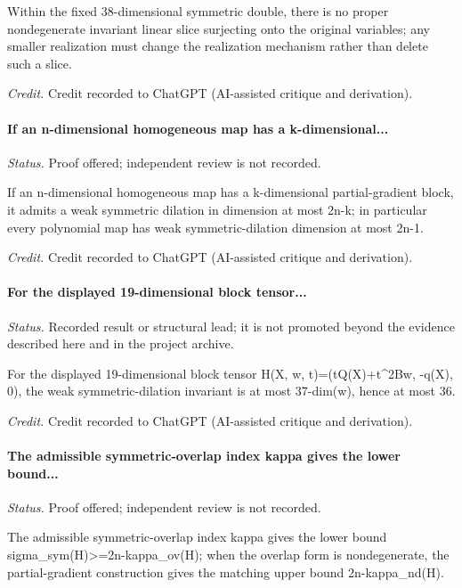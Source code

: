 Within the fixed 38-dimensional symmetric double, there is no proper nondegenerate invariant linear slice surjecting onto the original variables; any smaller realization must change the realization mechanism rather than delete such a slice.

\emph{Credit.} Credit recorded to ChatGPT (AI-assisted critique and derivation).

\label{supp-note-05-026}
\paragraph{If an n-dimensional homogeneous map has a k-dimensional...}
\emph{Status.} Proof offered; independent review is not recorded.

If an n-dimensional homogeneous map has a k-dimensional partial-gradient block, it admits a weak symmetric dilation in dimension at most 2n-k; in particular every polynomial map has weak symmetric-dilation dimension at most 2n-1.

\emph{Credit.} Credit recorded to ChatGPT (AI-assisted critique and derivation).

\label{supp-note-05-027}
\paragraph{For the displayed 19-dimensional block tensor...}
\emph{Status.} Recorded result or structural lead; it is not promoted beyond the evidence described here and in the project archive.

For the displayed 19-dimensional block tensor H(X, w, t)=(tQ(X)+t\textasciicircum{}2Bw, -q(X), 0), the weak symmetric-dilation invariant is at most 37-dim(w), hence at most 36.

\emph{Credit.} Credit recorded to ChatGPT (AI-assisted critique and derivation).

\label{supp-note-05-028}
\paragraph{The admissible symmetric-overlap index kappa gives the lower bound...}
\emph{Status.} Proof offered; independent review is not recorded.

The admissible symmetric-overlap index kappa gives the lower bound sigma\_sym(H)>=2n-kappa\_ov(H); when the overlap form is nondegenerate, the partial-gradient construction gives the matching upper bound 2n-kappa\_nd(H).

